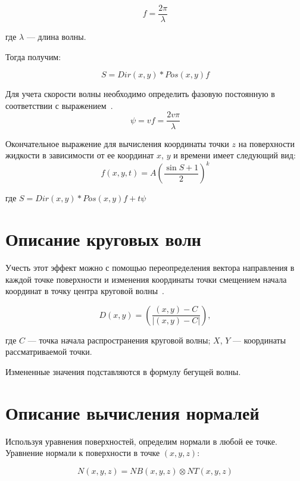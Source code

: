 \begin{equation}
    f = \dfrac{2\pi}{\lambda}
\end{equation}

где $\lambda$ — длина волны.

Тогда получим:

\begin{equation}
    S = Dir(x,y)*Pos(x,y)f
\end{equation}

Для учета скорости волны необходимо определить фазовую постоянную в соответствии с выражением~\cite{WAVE}.
\begin{equation}
    \psi = vf = \dfrac{2v\pi}{\lambda}
\end{equation}

Окончательное выражение для вычисления координаты точки $z$ на поверхности жидкости 
в зависимости от ее координат $x$, $y$ и времени имеет следующий вид:
\begin{equation}
    f(x,y,t) = A\left(\dfrac{\sin{S} + 1}{2}\right)^k
\end{equation}

где $S = Dir(x, y)*Pos(x, y)f + t\psi$

\section{Описание круговых волн}
Учесть этот эффект можно с помощью переопределения вектора направления в каждой точке поверхности 
и изменения координаты точки смещением начала координат в точку центра круговой волны~\cite{WAVE}.

\begin{equation}
        D(x,y) = \left(\dfrac{(x, y) - C}{|(x, y) - C|}\right),
\end{equation}

где $C$ --- точка начала распространения круговой волны; 
$X$, $Y$ --- координаты рассматриваемой точки.


Измененные значения подставляются в формулу бегущей волны.

\section{Описание вычисления нормалей}

Используя уравнения поверхностей, определим нормали в любой ее точке. 
Уравнение нормали к поверхности в точке $(x, y, z)$:

\begin{equation}
    N(x,y,z) = NB(x,y,z)\otimes NT(x,y,z)
\end{equation}

